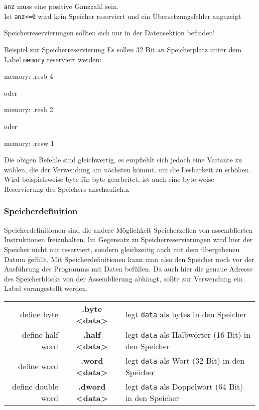 \begin{warningblock}
	\texttt{anz} muss eine positive Ganzzahl sein.\\
	Ist \texttt{anz<=0} wird kein Speicher reserviert und ein Übersetzungsfehler angezeigt
\end{warningblock}

\begin{warningblock}
	Speicherreservierungen sollten sich nur in der Datensektion befinden!
\end{warningblock}

\begin{exampleblock}{Beispiel zur Speicherreservierung}
	Es sollen 32 Bit an Speicherplatz unter dem Label \texttt{memory} reserviert werden:
	\begin{riscv}
	memory: .resb 4
	\end{riscv}
	oder
	\begin{riscv}
	memory: .resh 2
	\end{riscv}
	oder
	\begin{riscv}
	memory: .resw 1
	\end{riscv}
	Die obigen Befehle sind gleichwertig, es empfiehlt sich jedoch eine Variante zu wählen, die der Verwendung am nächsten kommt, um die Lesbarkeit zu erhöhen. Wird beispielsweise byte für byte gearbeitet, ist auch eine byte-weise Reservierung des Speichers anschaulich.x
\end{exampleblock}

\subsubsection{Speicherdefinition}

Speicherdefinitionen sind die andere Möglichkeit Speicherzellen von
assemblierten Instruktionen freizuhalten. Im Gegensatz zu Speicherreservierungen
wird hier der Speicher nicht nur reserviert, sondern gleichzeitig auch mit dem
übergebenen Datum gefüllt. Mit Speicherdefinitionen kann man also den Speicher
noch vor der Ausführung des Programms mit Daten befüllen. Da auch hier die
genaue Adresse des Speicherblocks von der Assemblierung abhängt, sollte zur
Verwendung ein Label vorangestellt werden.\\

\begin{centering}
	\begin{tabular}{rcl}
		define byte & \textbf{.byte <data>} & legt \texttt{data} als bytes in den Speicher\\
		define half word & \textbf{.half <data>} & legt \texttt{data} als Halbwörter (16 Bit) in den Speicher\\
		define word & \textbf{.word <data>} & legt \texttt{data} als Wort (32 Bit) in den Speicher\\
		define double word & \textbf{.dword <data>} & legt \texttt{data} als Doppelwort (64 Bit) in den Speicher\\
	\end{tabular}
\end{centering}

